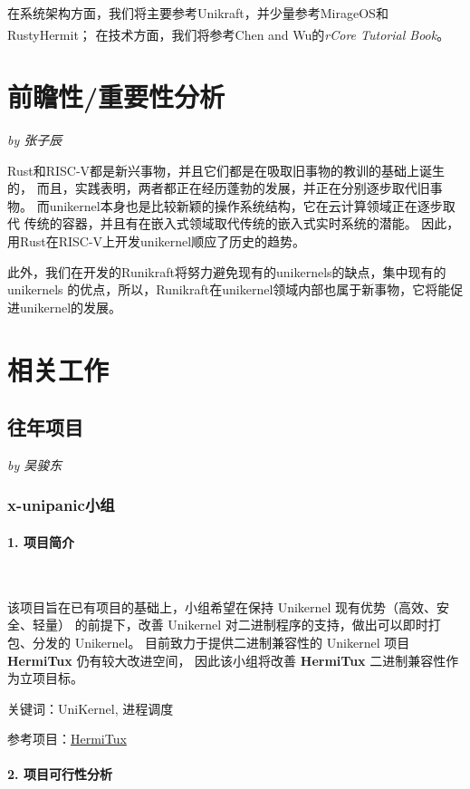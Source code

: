 \documentclass[UTF8,fontset=none,linespread=1.15]{ctexart}
\let\nosupcite\cite
\renewcommand*{\cite}[1]{\textsuperscript{\nosupcite{#1}}}
\newcommand{\sectionauthor}[1]{%
\vspace*{-5ex}
\noindent\textrm{\hfill\textit{by #1}}
\vspace*{2ex}\par}
\begin{document}
在系统架构方面，我们将主要参考Unikraft，并少量参考MirageOS和RustyHermit；
在技术方面，我们将参考Chen and Wu的\textit{rCore Tutorial Book}\cite{bib:rcore-os}。

\section{前瞻性/重要性分析}\sectionauthor{张子辰}
Rust和RISC-V都是新兴事物，并且它们都是在吸取旧事物的教训的基础上诞生的，
而且，实践表明，两者都正在经历蓬勃的发展，并正在分别逐步取代旧事物。
而unikernel本身也是比较新颖的操作系统结构，它在云计算领域正在逐步取代
传统的容器，并且有在嵌入式领域取代传统的嵌入式实时系统的潜能。
因此，用Rust在RISC-V上开发unikernel顺应了历史的趋势。

此外，我们在开发的Runikraft将努力避免现有的unikernels的缺点，集中现有的unikernels
的优点，所以，Runikraft在unikernel领域内部也属于新事物，它将能促进unikernel的发展。
\section{相关工作}
\subsection{往年项目}\sectionauthor{吴骏东}
\vspace*{-3ex}
\subsubsection{x-unipanic小组}\label{ssubsec:x-unipanic}

\paragraph{1. 项目简介}~\par

该项目旨在已有项目的基础上，小组希望在保持 Unikernel 现有优势（高效、安全、轻量）
的前提下，改善 Unikernel 对二进制程序的支持，做出可以即时打包、分发的 Unikernel。
目前致力于提供二进制兼容性的 Unikernel 项目 \textbf{HermiTux} 仍有较大改进空间，
因此该小组将改善 \textbf{HermiTux} 二进制兼容性作为立项目标。

关键词：UniKernel, 进程调度

参考项目：\href{https://github.com/ssrg-vt/hermitux}{HermiTux}

\paragraph{2. 项目可行性分析}~\par
\end{document}
